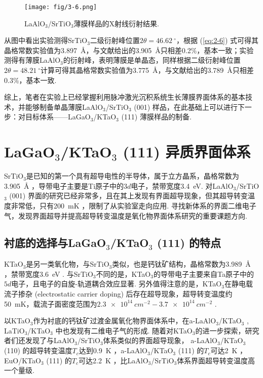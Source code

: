 \documentclass[12pt,a4paper,openany,twoside,UTF-8]{book}
\begin{document}
\begin{figure}[htbp]
\centering
\texttt{[image: fig/3-6.png]}
\caption{LaAlO$_3$/SrTiO$_3$薄膜样品的X射线衍射结果.}
\label{fig:3-6} 
\end{figure}
  
从图中看出实验测得SrTiO$_3$二级衍射峰位置$2\theta =\SI{46.62}{^\circ}$，根据 (\ref{eq:2-6}) 式可得其晶格常数实验值为\SI{3.897}{Å}，与文献给出的\SI{3.905}{Å}只相差0.2$\%$，基本一致；实验测得有薄膜LaAlO$_3$的衍射峰，表明薄膜是单晶态，同样根据二级衍射峰位置$2\theta =\SI{48.21}{^\circ}$计算可得其晶格常数实验值为\SI{3.775}{Å}，与文献给出的\SI{3.789}{Å}只相差0.3$\%$，基本一致. 

综上，笔者在实验上已经掌握利用脉冲激光沉积系统生长薄膜界面体系的基本技术，并能够制备单晶薄膜LaAlO$_3$/SrTiO$_3$ (001) 样品，在此基础上可以进行下一步：对目标体系——LaGaO$_3$/KTaO$_3$ (111) 薄膜样品的制备.

\section{LaGaO$_3$/KTaO$_3$ (111) 异质界面体系}
 SrTiO$_3$是已知的第一个具有超导电性的半导体，属于立方晶系，晶格常数为\SI{3.905}{Å} \cite{ref7}，导带电子主要是Ti原子中的$3d$电子，禁带宽度\SI{3.4}{eV}. 对LaAlO$_3$/SrTiO$_3$ (001) 界面的研究已经非常多，且在其上发现有界面超导现象，但其超导转变温度非常低，只有\SI{200}{mK} \cite{ref15}，限制了从实验室走向应用. 寻找新体系的界面二维电子气，发现界面超导并提高超导转变温度是氧化物界面体系研究的重要课题方向. 
  
\subsection{衬底的选择与LaGaO$_3$/KTaO$_3$ (111) 的特点}
  KTaO$_3$是另一类氧化物，与SrTiO$_3$类似，也是钙钛矿结构，晶格常数为\SI{3.989}{Å} \cite{ref13}，禁带宽度\SI{3.6}{eV} \cite{ref22}. 与SrTiO$_3$不同的是，KTaO$_3$的导带电子主要来自Ta原子中的$5d$电子，且电子的自旋-轨道耦合效应显著. 另外值得注意的是，KTaO$_3$在静电载流子掺杂 (electrostatic carrier doping) 后存在超导现象，超导转变温度约\SI{50}{mK}，载流子面密度范围为$\SI{2.3e14}{cm^{-2}}-\SI{3.7e14}{cm^{-2}}$ \cite{ref46}. 
  
  以KTaO$_3$作为衬底的钙钛矿过渡金属氧化物界面体系中，在a-LaAlO$_3$/KTaO$_3$ \cite{ref13} , LaTiO$_3$/KTaO$_3$ \cite{ref14}中也发现有二维电子气的形成. 随着对KTaO$_3$的进一步探索，研究者们还发现了与LaAlO$_3$/SrTiO$_3$体系类似的界面超导现象， a-LaAlO$_3$/KTaO$_3$ (110) 的超导转变温度$T_c$达到\SI{0.9}{K} \cite{ref21}，a-LaAlO$_3$/KTaO$_3$ (111) 的$T_c$可达\SI{2}{K} \cite{ref22, ref45}，EuO/KTaO$_3$ (111) 的$T_c$可达\SI{2.2}{K} \cite{ref22}，比LaAlO$_3$/SrTiO$_3$体系界面超导转变温度高一个量级.
  
\end{document}

